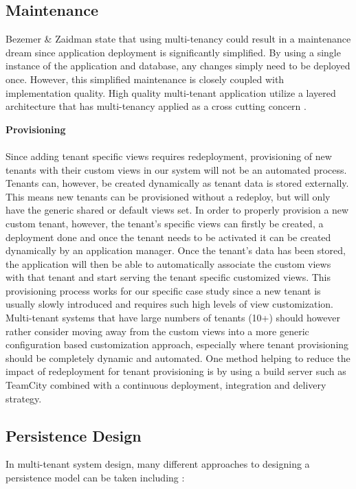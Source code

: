 \subsection{Maintenance}
\label{sec:maintainance}
Bezemer \& Zaidman \cite{Bezemer:2010:MSA:1862372.1862393} state that using multi-tenancy could result in a maintenance dream since application deployment is significantly simplified. By using a single instance of the application and database, any changes simply need to be deployed once. However, this simplified maintenance is closely coupled with implementation quality. High quality multi-tenant application utilize a layered architecture that has multi-tenancy applied as a cross cutting concern \cite{Bezemer:2010:MSA:1862372.1862393}.


\textbf{Provisioning}
\\
\\
Since adding tenant specific views requires redeployment, provisioning of new tenants with their custom views in our system will not be an automated process. Tenants can, however, be created dynamically as tenant data is stored externally. This means new tenants can be provisioned without a redeploy, but will only have the generic shared or default views set. In order to properly provision a new custom tenant, however, the tenant's specific views can firstly be created, a deployment done and once the tenant needs to be activated it can be created dynamically by an application manager. Once the tenant's data has been stored, the application will then be able to automatically associate the custom views with that tenant and start serving the tenant specific customized views. This provisioning process works for our specific case study since a new tenant is usually slowly introduced and requires such high levels of view customization. Multi-tenant systems that have large numbers of tenants (10+) should however rather consider moving away from the custom views into a more generic configuration based customization approach, especially where tenant provisioning should be completely dynamic and automated. One method helping to reduce the impact of redeployment for tenant provisioning is by using a build server such as TeamCity combined with a continuous deployment, integration and delivery strategy.


\subsection{Persistence Design}

In multi-tenant system design, many different approaches to designing a persistence model can be taken including \cite{Krebs2012}:

